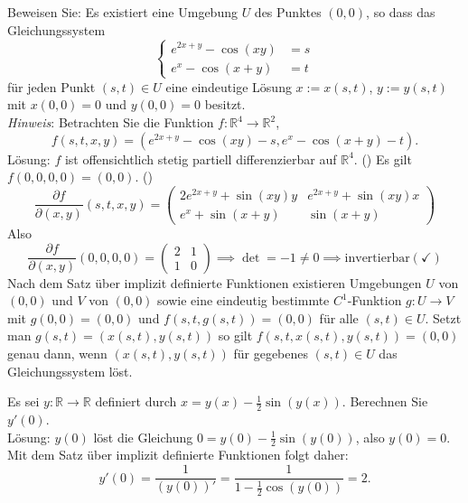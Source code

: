 \documentclass[parskip=full]{scrartcl}
\begin{document}
Beweisen Sie:
Es existiert eine Umgebung $U$ des Punktes $(0,0)$, so dass das Gleichungssystem
\begin{displaymath}
  \begin{cases}
    e^{2x + y} - \cos(xy) &= s\\
    e^x - \cos(x + y) &= t
  \end{cases}
\end{displaymath}
für jeden Punkt $(s,t) \in U$ eine eindeutige Lösung $x := x(s,t)$, $y := y(s,t)$ mit $x(0,0) = 0$ und $y(0,0) = 0$ besitzt.\\
\textit{Hinweis}: Betrachten Sie die Funktion $f : \mathbb{R}^4 \to \mathbb{R}^2$,
\begin{displaymath}
  f(s,t,x,y) = (e^{2x + y} - \cos(xy) - s, e^{x} - \cos(x + y) - t).
\end{displaymath}
Lösung:
$f$ ist offensichtlich stetig partiell differenzierbar auf $\mathbb{R}^4$. (\checkmark)
Es gilt $f(0,0,0,0) = (0,0)$. (\checkmark)
\begin{displaymath}
  \frac{\partial f}{\partial (x,y)} (s,t,x,y) =
  \begin{pmatrix}
    2e^{2x + y} + \sin(xy)y & e^{2x+y} + \sin(xy)x\\
    e^x + \sin(x + y) & \sin(x + y)
  \end{pmatrix}
\end{displaymath}
Also
\begin{displaymath}
  \frac{\partial f}{\partial (x,y)} (0,0,0,0) =
  \begin{pmatrix}
    2 & 1\\
    1 & 0
  \end{pmatrix}
  \implies \det = -1 \neq 0 \implies \text{invertierbar} (\checkmark)
\end{displaymath}
Nach dem Satz über implizit definierte Funktionen existieren Umgebungen $U$ von $(0,0)$ und $V$ von $(0,0)$ sowie eine eindeutig bestimmte $C^1$-Funktion $g : U \to V$ mit $g(0,0) = (0,0)$ und $f(s,t,g(s,t)) = (0,0)$ für alle $(s,t) \in U$.
Setzt man $g(s,t) = (x(s,t), y(s,t))$ so gilt $f(s,t,x(s,t), y(s,t)) = (0,0)$ genau dann, wenn $(x(s,t), y(s,t))$ für gegebenes $(s,t) \in U$ das Gleichungssystem löst.

Es sei $y : \mathbb{R} \to \mathbb{R}$ definiert durch $x = y(x) - \frac{1}{2} \sin(y(x))$.
Berechnen Sie $y'(0)$.\\
Lösung: 
$y(0)$ löst die Gleichung $0 = y(0) - \frac{1}{2}\sin(y(0))$, also $y(0) = 0$.
Mit dem Satz über implizit definierte Funktionen folgt daher:
\begin{displaymath}
  y'(0) = \frac{1}{(y(0))'} = \frac{1}{1 - \frac{1}{2} \cos(y(0))} = 2.
\end{displaymath}
\end{document}
